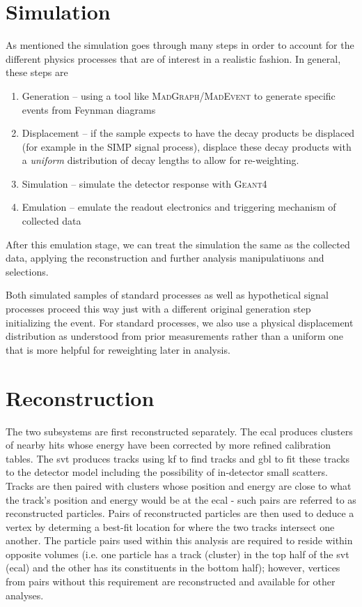 \section{Simulation} \label{sec:hps:sim}
As mentioned the simulation goes through many steps in order to account for the different physics
processes that are of interest in a realistic fashion. In general, these steps are
\begin{enumerate}
  \item Generation -- using a tool like \textsc{MadGraph/MadEvent}\cite{madgraph4-2007,madgraph5-2014}
        to generate specific events from Feynman diagrams
  \item Displacement -- if the sample expects to have the decay products be displaced (for example in the
        SIMP signal process), displace these decay products with a \emph{uniform} distribution of decay
        lengths to allow for re-weighting.
  \item Simulation -- simulate the detector response with \textsc{Geant4}\cite{geant4}
  \item Emulation -- emulate the readout electronics and triggering mechanism of collected data
\end{enumerate}
After this emulation stage, we can treat the simulation the same as the collected data,
applying the reconstruction and further analysis manipulatiuons and selections.

Both simulated samples of standard processes as well as hypothetical signal processes proceed this way
just with a different original generation step initializing the event. For standard processes, we also
use a physical displacement distribution as understood from prior measurements rather than a uniform
one that is more helpful for reweighting later in analysis.

\section{Reconstruction}
The two subsystems are first reconstructed separately.
The \ac{ecal} produces clusters of nearby hits whose energy
have been corrected by more refined calibration tables.
The \ac{svt} produces tracks using \ac{kf} to find tracks
and \ac{gbl} to fit these tracks to the detector model including
the possibility of in-detector small scatters.
Tracks are then paired with clusters whose position and energy
are close to what the track's position and energy would be at
the \ac{ecal} - such pairs are referred to as reconstructed
particles.
Pairs of reconstructed particles are then used to deduce a
vertex by determing a best-fit location for where the two tracks
intersect one another.
The particle pairs used within this analysis are required to reside
within opposite volumes (i.e. one particle has a track (cluster)
in the top half of the \ac{svt} (\ac{ecal}) and the other has its
constituents in the bottom half); however, vertices from pairs
without this requirement are reconstructed and available for
other analyses.

